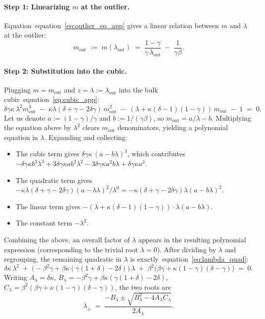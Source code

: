 \documentclass{article}
\def\eqref#1{equation~\ref{#1}}
\begin{document}
\paragraph{Step 1: Linearizing $m$ at the outlier.}
Equation~\eqref{eq:outlier_eq_app} gives a linear relation between $m$ and $\lambda$ at the outlier:
\begin{equation}\label{eq:m_out_app}
    m_\mathrm{out} \;:=\; m(\lambda_\mathrm{out}) \;=\; \frac{1-\gamma}{\gamma\,\lambda_\mathrm{out}} \;-\; \frac{1}{\gamma\beta}.
\end{equation}

\paragraph{Step 2: Substitution into the cubic.}
Plugging $m=m_\mathrm{out}$ and $z=\lambda:=\lambda_\mathrm{out}$ into the bulk cubic~\eqref{eq:cubic_app}:
\[
    \delta\gamma\kappa\,\lambda^2 m_\mathrm{out}^3 \;-\; \kappa\lambda(\delta+\gamma-2\delta\gamma)\,m_\mathrm{out}^2 \;-\; (\lambda+\kappa(\delta-1)(1-\gamma))\,m_\mathrm{out} \;-\; 1 \;=\; 0.
\]
Let us denote $a:= (1-\gamma)/\gamma$ and $b := 1/(\gamma\beta)$, so $m_\mathrm{out} = a/\lambda - b$. Multiplying the equation above by $\lambda^2$ clears $m_\mathrm{out}$ denominators, yielding a polynomial equation in $\lambda$. Expanding and collecting:
\begin{itemize}
    \item The cubic term gives $\delta\gamma\kappa\,(a-b\lambda)^3$, which contributes $-\delta\gamma\kappa b^3\lambda^3 + 3\delta\gamma\kappa a b^2\lambda^2 - 3\delta\gamma\kappa a^2 b\lambda + \delta\gamma\kappa a^3$.
    \item The quadratic term gives $-\kappa\lambda(\delta+\gamma-2\delta\gamma)(a-b\lambda)^2/\lambda^0 = -\kappa(\delta+\gamma-2\delta\gamma)\lambda(a-b\lambda)^2$.
    \item The linear term gives $-(\lambda+\kappa(\delta-1)(1-\gamma))\cdot\lambda(a-b\lambda)$.
    \item The constant term $-\lambda^2$.
\end{itemize}
Combining the above, an overall factor of $\lambda$ appears in the resulting polynomial expression (corresponding to the trivial root $\lambda=0$). After dividing by $\lambda$ and regrouping, the remaining quadratic in $\lambda$ is exactly~\eqref{eq:lambda_quad}:
\begin{equation}\label{eq:lambda_quad_app}
    \delta\kappa\,\lambda^2 \;+\; \big(-\beta^2\gamma + \beta\kappa(\gamma(1+\delta) - 2\delta)\big)\,\lambda \;+\; \beta^2\big(\beta\gamma + \kappa(1-\gamma)(\delta-\gamma)\big) \;=\; 0.
\end{equation}
Writing $A_\lambda=\delta\kappa$, $B_\lambda=-\beta^2\gamma+\beta\kappa(\gamma(1+\delta)-2\delta)$, $C_\lambda=\beta^2(\beta\gamma+\kappa(1-\gamma)(\delta-\gamma))$, the two roots are
\[
    \lambda_{\pm} \;=\; \frac{-B_\lambda\pm\sqrt{B_\lambda^2-4A_\lambda C_\lambda}}{2A_\lambda}.
\]
\end{document}
